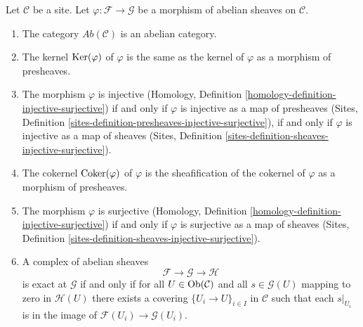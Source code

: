 \begin{lemma}
\label{lemma-abelian-abelian}
Let $\mathcal{C}$ be a site. Let $\varphi : \mathcal{F} \to \mathcal{G}$
be a morphism of abelian sheaves on $\mathcal{C}$.
\begin{enumerate}
\item The category $\textit{Ab}(\mathcal{C})$ is an abelian category.
\item The kernel $\mathop{\mathrm{Ker}}(\varphi)$ of $\varphi$ is the same as the
kernel of $\varphi$ as a morphism of presheaves.
\item The morphism $\varphi$ is injective
(Homology, Definition \ref{homology-definition-injective-surjective})
if and only if $\varphi$ is injective as a map of presheaves
(Sites, Definition \ref{sites-definition-presheaves-injective-surjective}),
if and only if $\varphi$ is injective as a map of sheaves
(Sites, Definition \ref{sites-definition-sheaves-injective-surjective}).
\item The cokernel $\mathop{\mathrm{Coker}}(\varphi)$ of $\varphi$ is the sheafification
of the cokernel of $\varphi$ as a morphism of presheaves.
\item The morphism $\varphi$ is surjective
(Homology, Definition \ref{homology-definition-injective-surjective})
if and only if $\varphi$ is surjective as a map of sheaves
(Sites, Definition \ref{sites-definition-sheaves-injective-surjective}).
\item A complex of abelian sheaves
$$
\mathcal{F} \to \mathcal{G} \to \mathcal{H}
$$
is exact at $\mathcal{G}$ if and only if for all
$U \in \mathop{\mathrm{Ob}}\nolimits(\mathcal{C})$ and all $s \in \mathcal{G}(U)$
mapping to zero in $\mathcal{H}(U)$ there exists a covering
$\{U_i \to U\}_{i \in I}$ in $\mathcal{C}$ such that each
$s|_{U_i}$ is in the image of $\mathcal{F}(U_i) \to \mathcal{G}(U_i)$.
\end{enumerate}
\end{lemma}


